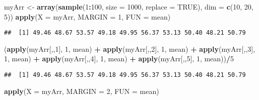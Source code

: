 \documentclass[]{book}
\newenvironment{Shaded}{\begin{snugshade}}{\end{snugshade}}
\newcommand{\KeywordTok}[1]{\textcolor[rgb]{0.13,0.29,0.53}{\textbf{#1}}}
\newcommand{\DataTypeTok}[1]{\textcolor[rgb]{0.13,0.29,0.53}{#1}}
\newcommand{\DecValTok}[1]{\textcolor[rgb]{0.00,0.00,0.81}{#1}}
\newcommand{\StringTok}[1]{\textcolor[rgb]{0.31,0.60,0.02}{#1}}
\newcommand{\OtherTok}[1]{\textcolor[rgb]{0.56,0.35,0.01}{#1}}
\newcommand{\OperatorTok}[1]{\textcolor[rgb]{0.81,0.36,0.00}{\textbf{#1}}}
\newcommand{\NormalTok}[1]{#1}
\theoremstyle{definition}
\theoremstyle{definition}
\theoremstyle{definition}
\theoremstyle{remark}
\begin{document}
\begin{Shaded}
\begin{Highlighting}[]
\NormalTok{myArr <-}\StringTok{ }\KeywordTok{array}\NormalTok{(}\KeywordTok{sample}\NormalTok{(}\DecValTok{1}\OperatorTok{:}\DecValTok{100}\NormalTok{, }\DataTypeTok{size =} \DecValTok{1000}\NormalTok{, }\DataTypeTok{replace =} \OtherTok{TRUE}\NormalTok{), }\DataTypeTok{dim =} \KeywordTok{c}\NormalTok{(}\DecValTok{10}\NormalTok{, }\DecValTok{20}\NormalTok{, }\DecValTok{5}\NormalTok{))}
\KeywordTok{apply}\NormalTok{(}\DataTypeTok{X =}\NormalTok{ myArr, }\DataTypeTok{MARGIN =} \DecValTok{1}\NormalTok{, }\DataTypeTok{FUN =}\NormalTok{ mean)}
\end{Highlighting}
\end{Shaded}

\begin{verbatim}
##  [1] 49.46 48.67 53.57 49.18 49.95 56.37 53.13 50.40 48.21 50.79
\end{verbatim}

\begin{Shaded}
\begin{Highlighting}[]
\NormalTok{(}\KeywordTok{apply}\NormalTok{(myArr[,,}\DecValTok{1}\NormalTok{], }\DecValTok{1}\NormalTok{, mean) }\OperatorTok{+}\StringTok{ }\KeywordTok{apply}\NormalTok{(myArr[,,}\DecValTok{2}\NormalTok{], }\DecValTok{1}\NormalTok{, mean) }\OperatorTok{+}\StringTok{ }
\StringTok{  }\KeywordTok{apply}\NormalTok{(myArr[,,}\DecValTok{3}\NormalTok{], }\DecValTok{1}\NormalTok{, mean) }\OperatorTok{+}\StringTok{ }\KeywordTok{apply}\NormalTok{(myArr[,,}\DecValTok{4}\NormalTok{], }\DecValTok{1}\NormalTok{, mean) }\OperatorTok{+}\StringTok{ }
\StringTok{  }\KeywordTok{apply}\NormalTok{(myArr[,,}\DecValTok{5}\NormalTok{], }\DecValTok{1}\NormalTok{, mean))}\OperatorTok{/}\DecValTok{5}
\end{Highlighting}
\end{Shaded}

\begin{verbatim}
##  [1] 49.46 48.67 53.57 49.18 49.95 56.37 53.13 50.40 48.21 50.79
\end{verbatim}

\begin{Shaded}
\begin{Highlighting}[]
\KeywordTok{apply}\NormalTok{(}\DataTypeTok{X =}\NormalTok{ myArr, }\DataTypeTok{MARGIN =} \DecValTok{2}\NormalTok{, }\DataTypeTok{FUN =}\NormalTok{ mean)}
\end{Highlighting}
\end{Shaded}
\end{document}
